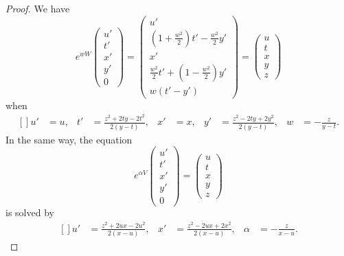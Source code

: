 \begin{proof}
We have
\begin{equation}
	 e^{wW}
\begin{pmatrix}
	u'	\\
	t'	\\
	x'	\\
	y'	\\
	0
\end{pmatrix}=
\begin{pmatrix}
	u'	\\
	\left( 1+\frac{ w^2 }{2} \right)t'-\frac{ w^2 }{2}y'	\\
	x'	\\
	\frac{ w^2 }{2}t'+\left( 1-\frac{ w^2 }{2} \right)y'	\\
	w(t'-y')
\end{pmatrix}
=
\begin{pmatrix}
	u	\\
	t	\\
	x	\\
	y	\\
	z
\end{pmatrix}
\end{equation}
when
\begin{equation}
	\begin{aligned}[]
		u'&=u,& t'&=\frac{ z^2+2ty-2t^2 }{ 2(y-t) },&x'&=x,&y'&=\frac{ z^2-2ty+2y^2 }{ 2(y-t) },&w&=-\frac{ z }{ y-t }.
	\end{aligned}
\end{equation}
In the same way, the equation
\begin{equation}
	 e^{\alpha V}\begin{pmatrix}
	u'	\\
	t'	\\
	x'	\\
	y'	\\
	0
\end{pmatrix}=
	 \begin{pmatrix}
	u	\\
	t\\
	x	\\
	y\\
	z
\end{pmatrix}
\end{equation}
is solved by
\begin{equation}
	\begin{aligned}[]
		u'&=\frac{ z^2+2ux-2u^2 }{ 2(x-u) },&x'&=\frac{ z^2-2ux+2x^2 }{ 2(x-u) },&\alpha&=-\frac{ z }{ x-u }.
	\end{aligned}
\end{equation}

\end{proof}
